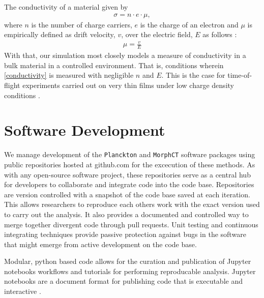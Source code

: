 The conductivity of a material given by 
\begin{align}
    \label{conductivity}
    \sigma = n \cdot e \cdot \mu,
\end{align}
where $n$ is the number of charge carriers, $e$ is the charge of an electron and $\mu$ is empirically
defined as drift velocity, $v$, over the electric field, $E$ as follows \cite{Kokil2012}:
\begin{align}
    \label{m}
    \mu = \frac{v}{E}
\end{align}
With that, our  simulation most closely models a measure of conductivity in a bulk material in a controlled
environment. That is, conditions wherein \autoref{conductivity} is measured with negligible $n$ and $E$.
This is the case for time-of-flight experiments carried out on very thin films under low charge density
conditions \cite{Chen2000a}.

\section{Software Development}

\label{software-methods}

We manage development of the \texttt{Planckton} and \texttt{MorphCT} software packages using public repositories hosted at
github.com\cite{cmelab} for the excecution of these methods.
As with any open-source software project, these repositories serve as a
central hub for developers to collaborate and integrate code into the code base. Repositories are
version controlled with a snapshot of the code base saved at each iteration. This allows researchers to 
reproduce each others work with the exact version used to carry out the analysis. It also provides a
documented and controlled way to merge together divergent code through pull requests. Unit testing and
continuous integrating techniques provide passive protection against bugs in the software that might emerge
from active development on the code base. 

Modular, python based code allows for the curation and publication of Jupyter notebooks workflows and
tutorials for performing reproducable analysis. Jupyter notebooks are a document format for publishing code
that is executable and interactive \cite{Kluyver2016}. 

